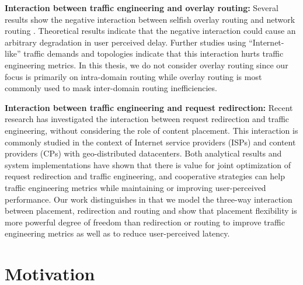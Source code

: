 \textbf{Interaction between traffic engineering and overlay routing:} Several results show the negative interaction between selfish overlay routing and network routing \cite{Roughgarden,selfishQiu}. Theoretical results indicate that the negative interaction could cause an arbitrary degradation in user perceived delay. Further studies using ``Internet-like'' traffic demands and topologies indicate that this interaction hurts traffic engineering metrics. In this thesis, we do not consider overlay routing since our focus is primarily on intra-domain routing while overlay routing is most commonly used to mask inter-domain routing inefficiencies.


\textbf{Interaction between traffic engineering and request redirection:} Recent research has investigated the interaction between request redirection and traffic engineering, without considering the role of content placement. This interaction is commonly studied in the context of Internet service providers (ISPs) and content providers (CPs) with geo-distributed datacenters. Both analytical results \cite{Jiang2009,JohariGameTheory} and system implementations \cite{CATE,P4P} have shown that there is value for joint optimization of request redirection and traffic engineering, and cooperative strategies can help traffic engineering metrics while maintaining or improving user-perceived performance. Our work distinguishes in that  we model the three-way interaction between placement, redirection and routing and show that placement flexibility is more powerful degree of freedom than redirection or routing to improve traffic engineering metrics as well as to reduce user-perceived latency.


\section{Motivation}
\label{sec:bg-motivation}

